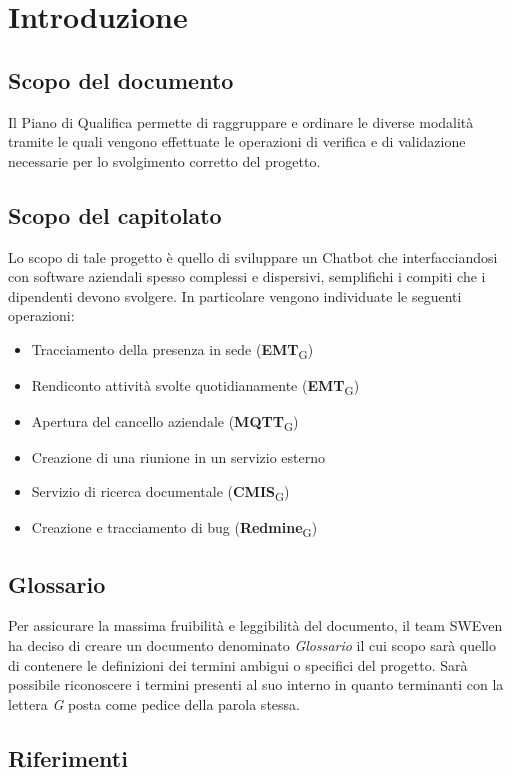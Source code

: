 \section{Introduzione}
\subsection{Scopo del documento}
Il Piano di Qualifica permette di raggruppare e ordinare le diverse modalità tramite le quali 
vengono effettuate le operazioni di verifica e di validazione necessarie per lo svolgimento corretto 
del progetto.

\subsection{Scopo del capitolato}
Lo scopo di tale progetto è quello di sviluppare un Chatbot che interfacciandosi con software aziendali spesso complessi e dispersivi, semplifichi i compiti che i dipendenti devono svolgere. In particolare vengono individuate le seguenti operazioni: 
\begin{itemize}
	\item Tracciamento della presenza in sede (\textbf{EMT}\textsubscript{G})
	\item Rendiconto attività svolte quotidianamente (\textbf{EMT}\textsubscript{G})
	\item Apertura del cancello aziendale (\textbf{MQTT}\textsubscript{G})
	\item Creazione di una riunione in un servizio esterno
	\item Servizio di ricerca documentale (\textbf{CMIS}\textsubscript{G})
	\item Creazione e tracciamento di bug (\textbf{Redmine}\textsubscript{G})
\end{itemize}

\subsection{Glossario}
Per assicurare la massima fruibilità e leggibilità del documento, il team SWEven ha deciso di creare un documento denominato \textit{Glossario} il cui scopo sarà quello di contenere le definizioni dei termini ambigui o specifici del progetto. Sarà possibile riconoscere i termini presenti al suo interno in quanto terminanti con la lettera \textit{G} posta come pedice della parola stessa. 
\subsection{Riferimenti}

